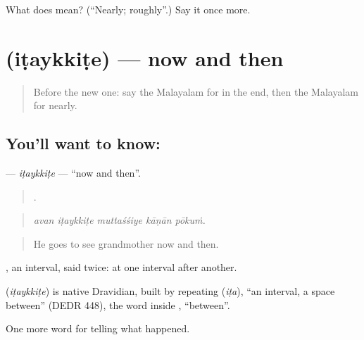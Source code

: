 \begin{tcolorbox}[breakable,colback=teal!4,colframe=teal!35!black,title={Before you move on}]
What does  mean? (\textquotedblleft{}Nearly; roughly\textquotedblright{}.) Say it once more.
\end{tcolorbox}
\section[\texorpdfstring{\ml{ഇടയ്ക്കിടെ} (iṭaykkiṭe)}{ഇടയ്ക്കിടെ (iṭaykkiṭe)}]{ (iṭaykkiṭe) — now and then}

\label{lesson:ML-C359-itaykkite}



\begin{quote}
Before the new one: say the Malayalam for in the end, then the Malayalam for nearly.
\end{quote}

\subsection*{You'll want to know: }
\textbf{} — \emph{iṭaykkiṭe} — \textquotedblleft{}now and then\textquotedblright{}.

\begin{quote}
    .
\end{quote}

\begin{quote}
\emph{avan iṭaykkiṭe muttaśśiye kāṇān pōkuṁ.}
\end{quote}

\begin{quote}
He goes to see grandmother now and then.
\end{quote}

, an interval, said twice: at one interval after another.

\begin{cousinweb}
\textbf{} (\emph{iṭaykkiṭe}) is native Dravidian, built by repeating  (\emph{iṭa}), \textquotedblleft{}an interval, a space between\textquotedblright{} (DEDR 448), the word inside , \textquotedblleft{}between\textquotedblright{}.
\end{cousinweb}

\begin{grammarlens}[title={What you've built}]
One more word for telling what happened.
\end{grammarlens}

